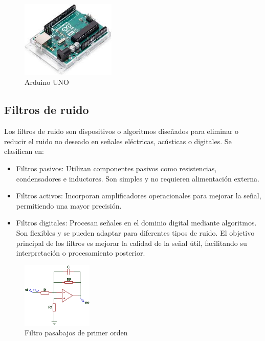 \documentclass[conference]{IEEEtran}
\begin{document}
	\begin{figure}[h]
		\centering
		\includegraphics[width=0.4\textwidth]{media/arduino-uno.jpg}
		\caption{Arduino UNO}
		\label{fig:arduino-uno}
	\end{figure}
	
	\subsection{Filtros de ruido}
	Los filtros de ruido son dispositivos o algoritmos diseñados para eliminar o reducir el ruido no deseado en señales eléctricas, acústicas o digitales. Se clasifican en:
	
	\begin{itemize}
		\item Filtros pasivos: Utilizan componentes pasivos como resistencias, condensadores e inductores. Son simples y no requieren alimentación externa.
		\item Filtros activos: Incorporan amplificadores operacionales para mejorar la señal, permitiendo una mayor precisión.
		\item Filtros digitales: Procesan señales en el dominio digital mediante algoritmos. Son flexibles y se pueden adaptar para diferentes tipos de ruido. El objetivo principal de los filtros es mejorar la calidad de la señal útil, facilitando su interpretación o procesamiento posterior.
	\end{itemize}
	
	\begin{figure}[h]
		\centering
		\includegraphics[width=0.3\textwidth]{media/filtro-pasa-bajos.png}
		\caption{Filtro pasabajos de primer orden}
		\label{fig:filtro-pasabajos}
	\end{figure}
	
\end{document}
